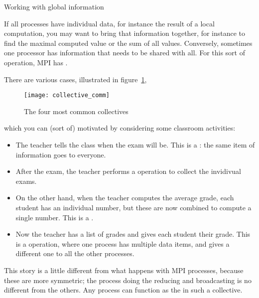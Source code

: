 
 {Working with global information}
\label{sec:collective}

If all processes have individual data, for instance the result
of a local computation, you may want to bring that information
together, for instance to find the maximal computed value
or the sum of all values. Conversely, sometimes one processor has
information that needs to be shared with all.
For this sort of operation, MPI
has .

There are various cases, illustrated in figure~\ref{fig:collectives},
\begin{figure}[ht]
  \texttt{[image: collective\_comm]}  
  \caption{The four most common collectives}
  \label{fig:collectives}
\end{figure}
which you can (sort of) motivated by considering some classroom activities:
\begin{itemize}
\item The teacher tells the class when the exam will be. This is a
  : the same item of information goes to everyone.
\item After the exam, the teacher performs a 
  operation to collect the invidivual exams.
\item On the other hand, when the teacher computes the average grade,
  each student has an individual number, but these are now combined to
  compute a single number. This is a .
\item Now the teacher has a list of grades and gives each student their
  grade. This is a  operation, where one process
  has multiple data items, and gives a different one to all the other
  processes.
\end{itemize}

This story is a little different from what happens with MPI
processes, because these are more symmetric; the process doing the
reducing and broadcasting is no different from the others.
Any process can function as the  in such a
collective.

